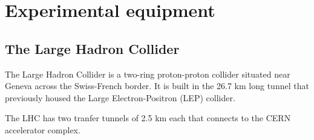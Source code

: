 
\chapter{Experimental equipment}
\label{sec:LHCATLAS}

\section{The Large Hadron Collider}
The Large Hadron Collider is a two-ring proton-proton collider situated near Geneva across the Swiss-French border. It is built in the 26.7 km long tunnel 
that previously housed the Large Electron-Positron (LEP) collider. 


The LHC has two tranfer tunnels of 2.5 km each that connects to the CERN accelerator complex. 